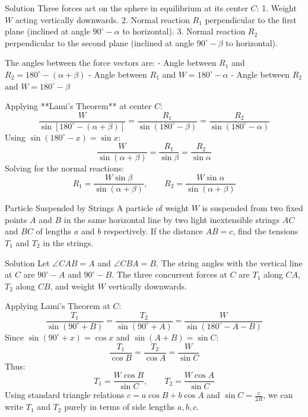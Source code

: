 \documentclass[11pt,a4paper]{article}
\begin{document}
\begin{proofbox}{Solution}
Three forces act on the sphere in equilibrium at its center $C$:
1. Weight $W$ acting vertically downwards.
2. Normal reaction $R_1$ perpendicular to the first plane (inclined at angle $90^\circ - \alpha$ to horizontal).
3. Normal reaction $R_2$ perpendicular to the second plane (inclined at angle $90^\circ - \beta$ to horizontal).

The angles between the force vectors are:
- Angle between $R_1$ and $R_2 = 180^\circ - (\alpha + \beta)$
- Angle between $R_1$ and $W = 180^\circ - \alpha$
- Angle between $R_2$ and $W = 180^\circ - \beta$

Applying **Lami's Theorem** at center $C$:
\[
\frac{W}{\sin[180^\circ - (\alpha + \beta)]} = \frac{R_1}{\sin(180^\circ - \beta)} = \frac{R_2}{\sin(180^\circ - \alpha)}
\]
Using $\sin(180^\circ - x) = \sin x$:
\[
\frac{W}{\sin(\alpha + \beta)} = \frac{R_1}{\sin\beta} = \frac{R_2}{\sin\alpha}
\]
Solving for the normal reactions:
\begin{equation}
R_1 = \frac{W \sin\beta}{\sin(\alpha + \beta)}, \qquad R_2 = \frac{W \sin\alpha}{\sin(\alpha + \beta)}
\end{equation}
\end{proofbox}

\begin{examplebox}{Particle Suspended by Strings}
A particle of weight $W$ is suspended from two fixed points $A$ and $B$ in the same horizontal line by two light inextensible strings $AC$ and $BC$ of lengths $a$ and $b$ respectively. If the distance $AB = c$, find the tensions $T_1$ and $T_2$ in the strings.
\end{examplebox}

\begin{proofbox}{Solution}
Let $\angle CAB = A$ and $\angle CBA = B$. The string angles with the vertical line at $C$ are $90^\circ - A$ and $90^\circ - B$.
The three concurrent forces at $C$ are $T_1$ along $CA$, $T_2$ along $CB$, and weight $W$ vertically downwards.

Applying Lami's Theorem at $C$:
\[
\frac{T_1}{\sin(90^\circ + B)} = \frac{T_2}{\sin(90^\circ + A)} = \frac{W}{\sin(180^\circ - A - B)}
\]
Since $\sin(90^\circ + x) = \cos x$ and $\sin(A+B) = \sin C$:
\[
\frac{T_1}{\cos B} = \frac{T_2}{\cos A} = \frac{W}{\sin C}
\]
Thus:
\begin{equation}
T_1 = \frac{W \cos B}{\sin C}, \qquad T_2 = \frac{W \cos A}{\sin C}
\end{equation}
Using standard triangle relations $c = a \cos B + b \cos A$ and $\sin C = \frac{c}{2R}$, we can write $T_1$ and $T_2$ purely in terms of side lengths $a, b, c$.
\end{proofbox}
\end{document}
